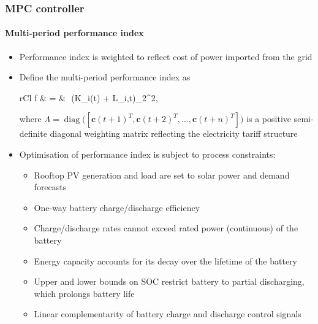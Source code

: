 \documentclass[handout, smaller, xcolor=table]{beamer}			%
\newcommand{\sqrts}[2][]{\,\sqrt[#1]{#2}\,}
\begin{document}
\begin{frame}
	\frametitle{MPC controller}
	\framesubtitle{Multi-period performance index}

	\begin{itemize}
		\item  Performance index is weighted to reflect cost of power imported from the grid
		\item  Define the multi-period performance index as
		\begin{IEEEeqnarray*}{rCl}
				f & = & \left\lVert\sqrts{\Lambda}\big(K_{i}(t) + L_{i,t}\big)\right\rVert_{2}^{2},
		\end{IEEEeqnarray*}
		where $\Lambda = \operatorname{diag}\big([\boldsymbol{c}(t\!+\!1)^{T}, \boldsymbol{c}(t\!+\!2)^{T}, \ldots, \boldsymbol{c}(t\!+\!n)^{T}]\big)$ is a positive semi-definite diagonal weighting matrix reflecting the electricity tariff structure
		
		\item  Optimisation of performance index is subject to process constraints:
		\begin{itemize}
			\item  Rooftop PV generation and load are set to solar power and demand forecasts %
			\item  One-way battery charge/discharge efficiency%
			\item  Charge/discharge rates cannot exceed rated power (continuous) of the battery
			\item  Energy capacity accounts for its decay over the lifetime of the battery
			\item  Upper and lower bounds on SOC restrict battery to partial discharging, which prolongs battery life
			\item  Linear complementarity of battery charge and discharge control signals
		\end{itemize}
		
	\end{itemize}

\end{frame}
\end{document}
